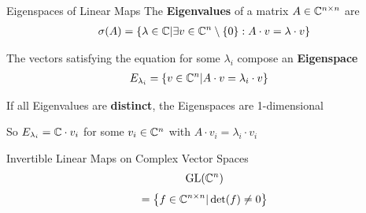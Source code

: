 \begin{frame}{Eigenspaces of Linear Maps}
    \large
    The \textbf{Eigenvalues} of a matrix $A \in \mathbb{C}^{n \times n}$ are
    \pause
    \begin{align*}
        \sigma(A) =
        \left\{
            \lambda \in \mathbb{C} | \exists v \in \mathbb{C}^n \setminus \{0\}: A \cdot v = \lambda \cdot v
        \right\}
    \end{align*}
    
    \pause
    The vectors satisfying the equation for some $\lambda_i$ compose an \textbf{Eigenspace}
    \pause
    \begin{align*}
        E_{\lambda_i} & = \left\{
            v \in \mathbb{C}^n | A \cdot v = \lambda_i \cdot v
        \right\}
    \end{align*}
    
    \pause
    If all Eigenvalues are \textbf{distinct}, the Eigenspaces are 1-dimensional

    \pause
    So $E_{\lambda_i} = \mathbb{C} \cdot v_i$ for some $v_i \in \mathbb{C}^n$ with $A \cdot v_i = \lambda_i \cdot v_i$ 
\end{frame}

\begin{frame}{Invertible Linear Maps on Complex Vector Spaces}
    \huge
    \begin{align*}
        \operatorname{GL}(\mathbb{C}^n)
    \end{align*}
    \pause
    \large
    \begin{align*}
        = \left\{
            f \in \mathbb{C}^{n \times n} | \det(f) \neq 0
        \right\}
    \end{align*}

\end{frame}
